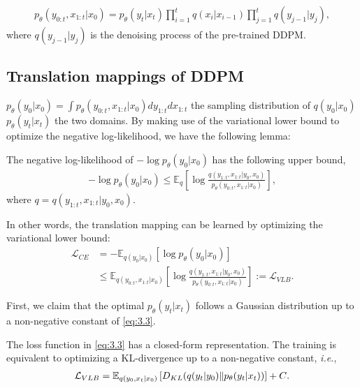 \begin{align}
p_{\theta}(y_{0:t},x_{1:t}|x_0)=p_{\theta}(y_t|x_t)\prod_{i=1}^t q(x_i|x_{i-1})\prod_{j=1}^t q(y_{j-1}|y_j), \label{eq:3.2}
\end{align}
%
where $q(y_{j-1}|y_j)$ is the denoising process of the pre-trained DDPM. 

\subsection{Translation mappings of DDPM}\label{subsec:Transfer_Mappings}

 $p_{\theta}(y_0|x_0)=\int p_{\theta}(y_{0:t},x_{1:t}|x_0)dy_{1:t}dx_{1:t}$  the sampling distribution of $q(y_0|x_0)$ $p_{\theta}(y_t|x_t)$  the two domains.
%
By making use of the variational lower bound to optimize the negative log-likelihood, we have the following lemma:
%
\begin{lemma}\label{lem:1}
The negative log-likelihood of $-\log p_{\theta}(y_0|x_0)$ has the following upper bound,
%
\begin{align}
-\log p_{\theta}(y_0|x_0)\leqslant\mathbb E_q\left[\log\frac{q(y_{1:t},x_{1:t}|y_0, x_0)}{p_{\theta}(y_{0:t},x_{1:t}|x_0)}\right],
\end{align}
%
where $q=q(y_{1:t},x_{1:t}|y_0, x_0).$
\end{lemma}
%
In other words, the translation mapping can be learned by optimizing the variational lower bound:
%
\begin{align}\label{eq:3.3}
\mathcal L_{CE}&=\mathbb -\mathbb E_{q(y_0|x_0)}\left[\log p_{\theta}(y_0|x_0)\right]\\
&\leqslant\mathbb E_{q(y_{0:t},x_{1:t}|x_0)}\left[\log\frac{q(y_{1:t},x_{1:t}|y_0, x_0)}{p_{\theta}(y_{0:t},x_{1:t}|x_0)}\right]:=\mathcal L_{VLB}.
\end{align}


First, we claim that the optimal $p_{\theta}(y_t|x_t)$ follows a Gaussian distribution up to a non-negative constant of \cref{eq:3.3}.

\begin{theorem}\label{theorem:1}
The loss function in \cref{eq:3.3} has a closed-form representation.
%
The training is equivalent to optimizing a KL-divergence up to a non-negative constant, \textit{i.e.},
%
\begin{align}
\mathcal L_{VLB}=\mathbb E_{q(y_0,x_t|x_0)}\left[D_{KL}(q(y_t|y_0)\|p_{\theta}(y_t|x_t))\right] + C\textcolor{black}{.}\label{eq:3.4}
\end{align}
\end{theorem}

